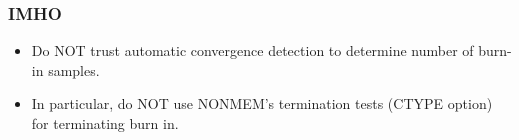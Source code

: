 \documentclass{beamer}
\begin{document}
\begin{frame}
\frametitle{IMHO}  

  \begin{itemize}
\item Do NOT trust automatic convergence detection to determine number
of burn-in samples. 
\item In particular, do NOT use NONMEM's termination tests (CTYPE
  option) for terminating burn in.
  \end{itemize}


\end{frame}

  



\end{document}
